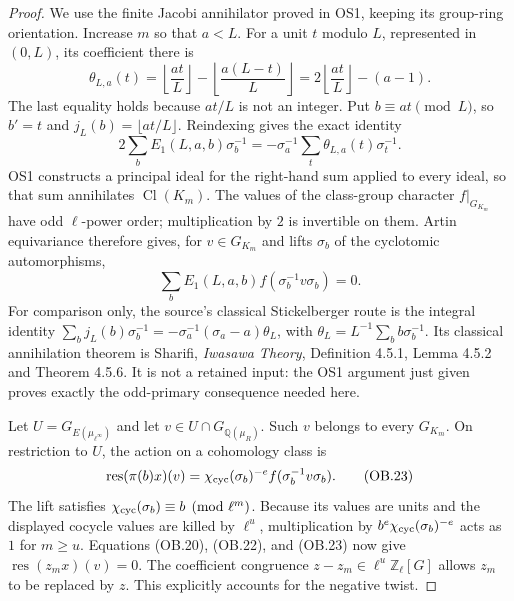 \begin{proof}
We use the finite Jacobi annihilator proved in OS1, keeping its
group-ring orientation.  Increase $m$ so that $a<L$.  For a unit
$t$ modulo $L$, represented in $(0,L)$, its coefficient there is
\[
 \theta_{L,a}(t)
 =\left\lfloor\frac{at}{L}\right\rfloor
       -\left\lfloor\frac{a(L-t)}{L}\right\rfloor
 =2\left\lfloor\frac{at}{L}\right\rfloor-(a-1).
\]
The last equality holds because $at/L$ is not an integer.  Put
$b\equiv at\pmod L$, so $b'=t$ and
$j_L(b)=\lfloor at/L\rfloor$.  Reindexing gives the exact identity
\[
 2\sum_bE_1(L,a,b)\sigma_b^{-1}
       =-\sigma_a^{-1}
               \sum_t\theta_{L,a}(t)\sigma_t^{-1}.
\]
OS1 constructs a principal ideal for the right-hand sum applied to
every ideal, so that sum annihilates $\operatorname{Cl}(K_m)$.
The values of the class-group character $f|_{G_{K_m}}$ have
odd $\ell$-power order; multiplication by $2$ is invertible on
them.  Artin equivariance therefore gives, for $v\in G_{K_m}$
and lifts $\sigma_b$ of the cyclotomic automorphisms,
\[
              \sum_b E_1(L,a,b)f(\sigma_b^{-1}v\sigma_b)=0.
 \tag{OB.22}
\]
For comparison only, the source's classical Stickelberger route is
the integral identity
$\sum_bj_L(b)\sigma_b^{-1}=-\sigma_a^{-1}(\sigma_a-a)\theta_L$,
with $\theta_L=L^{-1}\sum_b b\sigma_b^{-1}$.
Its classical annihilation theorem is Sharifi,
\emph{Iwasawa Theory}, Definition 4.5.1, Lemma 4.5.2 and
Theorem 4.5.6.  It is not a retained input: the OS1 argument just
given proves exactly the odd-primary consequence needed here.

Let $U=G_{E(\mu_{\ell^\infty})}$ and let
$v\in U\cap G_{\mathbb Q(\mu_R)}$.  Such $v$ belongs to every
$G_{K_m}$.  On restriction to $U$, the action on a cohomology class is
\[
 \operatorname{res}(\pi(b)x)(v)
   =\chi_{\rm cyc}(\sigma_b)^{-e}
                       f(\sigma_b^{-1}v\sigma_b).
 \tag{OB.23}
\]
The lift satisfies $\chi_{\rm cyc}(\sigma_b)\equiv b\pmod{\ell^m}$.
Because its values are units and the displayed cocycle values are
killed by $\ell^u$, multiplication by
$b^e\chi_{\rm cyc}(\sigma_b)^{-e}$ acts as $1$ for $m\ge u$.
Equations (OB.20), (OB.22), and (OB.23) now give
$\operatorname{res}(z_mx)(v)=0$.  The coefficient congruence
$z-z_m\in\ell^u\mathbb Z_\ell[G]$ allows $z_m$ to be replaced
by $z$.  This explicitly accounts for the negative twist.


\end{proof}
